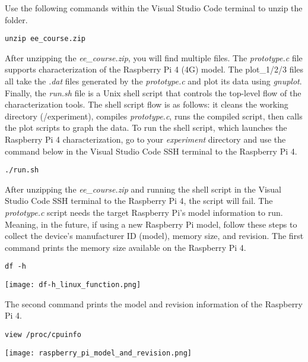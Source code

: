 \documentclass[journal]{IEEEtran}
\begin{document}
    Use the following commands within the Visual Studio Code terminal to unzip the folder.

    \begin{lstlisting}[frame=single]
        unzip ee_course.zip
    \end{lstlisting}

    After unzipping the \emph{ee\_course.zip}, you will find multiple files. 
    The \emph{prototype.c} file supports characterization of the Raspberry Pi 4 (4G) model. 
    The plot\_1/2/3 files all take the \emph{.dat} files generated by the \emph{prototype.c} and plot its data using \emph{gnuplot}.
    Finally, the \emph{run.sh} file is a Unix shell script that controls the top-level flow of the characterization tools. 
    The shell script flow is as follows: it cleans the working directory (/experiment), compiles \emph{prototype.c}, runs the compiled script, then calls the plot scripts to graph the data.
    To run the shell script, which launches the Raspberry Pi 4 characterization, go to your \emph{experiment} directory and use the command below in the Visual Studio Code SSH terminal to the Raspberry Pi 4.

    \begin{lstlisting}[frame=single]
        ./run.sh
    \end{lstlisting}

    After unzipping the \emph{ee\_course.zip} and running the shell script in the Visual Studio Code SSH terminal to the Raspberry Pi 4, the script will fail.
    The \emph{prototype.c} script needs the target Raspberry Pi's model information to run. 
    Meaning, in the future, if using a new Raspberry Pi model, follow these steps to collect the device's manufacturer ID (model), memory size, and revision. 
    The first command prints the memory size available on the Raspberry Pi 4.

    \begin{lstlisting}[frame=single]
        df -h
    \end{lstlisting}

    \texttt{[image: df-h\_linux\_function.png]}

    The second command prints the model and revision information of the Raspberry Pi 4.

    \begin{lstlisting}[frame=single]
        view /proc/cpuinfo
    \end{lstlisting}

    \texttt{[image: raspberry\_pi\_model\_and\_revision.png]}
\end{document}
